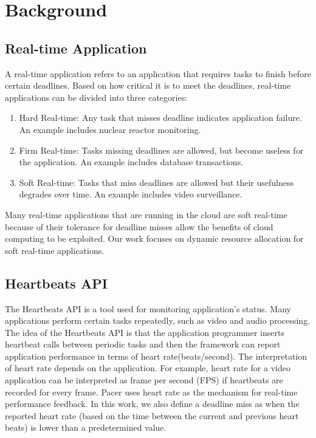 \section{Background}
\label{sb}
  

\subsection{Real-time Application}
A real-time application refers to an application that requires tasks to finish before certain deadlines. Based on how critical it is to meet the deadlines, real-time applications can be divided into three categories\cite{rtapp}: 
\begin{enumerate}
\item Hard Real-time: Any task that misses deadline indicates application failure. An example includes nuclear reactor monitoring.
\item Firm Real-time: Tasks missing deadlines are allowed, but become useless for the application. An example includes database transactions. 
\item Soft Real-time: Tasks that miss deadlines are allowed but their usefulness degrades over time. An example includes video surveillance. 
\end{enumerate}
Many real-time applications that are running in the cloud are soft real-time because of their tolerance for deadline misses allow the benefits of cloud computing to be exploited. Our work focuses on dynamic resource allocation for soft real-time applications. 

\subsection{Heartbeats API}
The Heartbeats API\cite{hb} is a tool used for monitoring application's status. Many applications perform certain tasks repeatedly, such as video and audio processing. The idea of the Heartbeats API is that the application programmer inserts heartbeat calls between periodic tasks and then the framework can report application performance in terms of heart rate(beats/second). The interpretation of heart rate depends on the application. For example, heart rate for a video application can be interpreted as frame per second (FPS) if heartbeats are recorded for every frame. Pacer uses heart rate as the mechanism for real-time performance feedback. In this work, we also define a deadline miss as when the reported heart rate (based on the time between the current and previous heart beats) is lower than a predetermined value.



